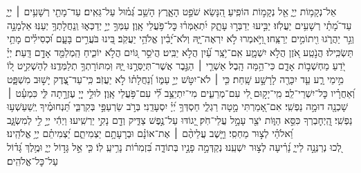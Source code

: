 \documentclass[twoside, openany, parskip=half, 11pt]{book}
\begin{document}
{\begin{narrow}
\end{narrow}

\begin{narrow}
%
אֵל־נְקָמ֥וֹת יְיָ֑ אֵ֖ל נְקָמ֣וֹת הוֹפִֽיעַ׃
הִ֭נָּשֵׂא שֹׁפֵ֣ט הָאָ֑רֶץ הָשֵׁ֥ב גְּ֝מ֗וּל עַל־גֵּאִֽים׃
עַד־מָתַ֖י רְשָׁעִ֥ים ׀ יְיָ֑ עַד־מָ֝תַ֗י רְשָׁעִ֥ים יַעֲלֹֽזוּ׃
יַבִּ֣יעוּ יְדַבְּר֣וּ עָתָ֑ק יִ֝תְאַמְּר֗וּ כׇּל־פֹּ֥עֲלֵי אָֽוֶן׃
עַמְּךָ֣ יְיָ֣ יְדַכְּא֑וּ וְֽנַחֲלָתְךָ֥ יְעַנּֽוּ׃
אַלְמָנָ֣ה וְגֵ֣ר יַהֲרֹ֑גוּ וִ֖יתוֹמִ֣ים יְרַצֵּֽחוּ׃
וַ֭יֹּ֣אמְרוּ לֹ֣א יִרְאֶה־יָּ֑הּ וְלֹא־יָ֝בִ֗ין אֱלֹהֵ֥י יַעֲקֹֽב׃
בִּ֭ינוּ בֹּעֲרִ֣ים בָּעָ֑ם וּ֝כְסִילִ֗ים מָתַ֥י תַּשְׂכִּֽילוּ׃
הֲנֹ֣טַֽע אֹ֭זֶן הֲלֹ֣א יִשְׁמָ֑ע אִֽם־יֹ֥צֵֽר עַ֗֝יִן הֲלֹ֣א יַבִּֽיט׃
הֲיֹסֵ֣ר גּ֭וֹיִם הֲלֹ֣א יוֹכִ֑יחַ הַֽמְלַמֵּ֖ד אָדָ֣ם דָּֽעַת׃
יְיָ֗ יֹ֭דֵעַ מַחְשְׁב֣וֹת אָדָ֑ם כִּי־הֵ֥מָּה הָֽבֶל׃
אַשְׁרֵ֤י ׀ הַגֶּ֣בֶר אֲשֶׁר־תְּיַסְּרֶ֣נּוּ יָּ֑הּ וּֽמִתּוֹרָתְךָ֥ תְלַמְּדֶֽנּוּ׃
לְהַשְׁקִ֣יט ל֭וֹ מִ֣ימֵי רָ֑ע עַ֤ד יִכָּרֶ֖ה לָרָשָׁ֣ע שָֽׁחַת׃
כִּ֤י ׀ לֹא־יִטֹּ֣שׁ יְיָ֣ עַמּ֑וֹ וְ֝נַחֲלָת֗וֹ לֹ֣א יַעֲזֹֽב׃
כִּֽי־עַד־צֶ֭דֶק יָשׁ֣וּב מִשְׁפָּ֑ט וְ֝אַחֲרָ֗יו כׇּל־יִשְׁרֵי־לֵֽב׃
מִֽי־יָק֣וּם לִ֭י עִם־מְרֵעִ֑ים מִי־יִתְיַצֵּ֥ב לִ֗֝י עִם־פֹּ֥עֲלֵי אָֽוֶן׃
לוּלֵ֣י יְיָ֭ עֶזְרָ֣תָה לִּ֑י כִּמְעַ֓ט ׀ שָׁכְנָ֖ה דוּמָ֣ה נַפְשִֽׁי׃
אִם־אָ֭מַרְתִּי מָ֣טָה רַגְלִ֑י חַסְדְּךָ֥ יְ֝יָ֗ יִסְעָדֵֽנִי׃
בְּרֹ֣ב שַׂרְעַפַּ֣י בְּקִרְבִּ֑י תַּ֝נְחוּמֶ֗יךָ יְֽשַׁעַשְׁע֥וּ נַפְשִֽׁי׃
הַֽ֭יְחׇבְרְךָ כִּסֵּ֣א הַוּ֑וֹת יֹצֵ֖ר עָמָ֣ל עֲלֵי־חֹֽק׃
יָ֭גוֹדּוּ עַל־נֶ֣פֶשׁ צַדִּ֑יק וְדָ֖ם נָקִ֣י יַרְשִֽׁיעוּ׃
וַיְהִ֬י יְיָ֣ לִ֣י לְמִשְׂגָּ֑ב וֵ֝אלֹהַ֗י לְצ֣וּר מַחְסִֽי׃
וַיָּ֤שֶׁב עֲלֵיהֶ֨ם ׀ אֶת־אוֹנָ֗ם וּבְרָעָתָ֥ם יַצְמִיתֵ֑ם יַ֝צְמִיתֵ֗ם יְיָ֥ אֱלֹהֵֽינוּ׃\\
%
לְ֭כוּ נְרַנְּנָ֣ה לַייָ֑ נָ֝רִ֗יעָה לְצ֣וּר יִשְׁעֵֽנוּ׃
נְקַדְּמָ֣ה פָנָ֣יו בְּתוֹדָ֑ה בִּ֝זְמִר֗וֹת נָרִ֥יעַֽ לֽוֹ׃
כִּ֤י אֵ֣ל גָּד֣וֹל יְיָ֑ וּמֶ֥לֶךְ גָּ֝ד֗וֹל עַל־כׇּל־אֱלֹהִֽים׃
\end{narrow}

}
\end{document}
